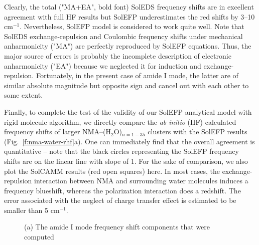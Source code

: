 \documentclass[a4paper,titlepage,twoside,fleqn,12pt]{book}
\begin{document}
\begin{refsection}
Clearly, the total ("MA+EA", bold font) SolEDS frequency shifts 
are in excellent agreement with full HF results
but SolEFP underestimates the red shifts by 3--10 cm$^{-1}$.
Nevertheless, 
SolEFP model is considered to work quite well. Note that 
SolEDS exchange\hyp{}repulsion
and Coulombic frequency shifts under mechanical anharmonicity ("MA")
are perfectly reproduced by SolEFP equations. Thus, the major source of errors
is probably the incomplete description of electronic anharmonicity ("EA")
because we neglected it for induction and exchange\hyp{}repulsion.
Fortunately, in the present case of amide I mode, the latter are
of similar absolute magnitude but opposite sign and cancel out with
each other to some extent.

Finally, to complete the test of the validity of our SolEFP
analytical model with rigid molecule algorithm, we directly
compare the \emph{ab initio} (HF) calculated frequency shifts of
larger NMA--(H$_2$O)$_{n = 1-35}$ clusters with the SolEFP results
(Fig.~\ref{f:nma-water-rhf}a). One can immediately find that the overall
agreement is quantitative -- note that the black circles representing
the SolEFP frequency shifts are on the linear line with
slope of 1. For the sake of comparison, we also plot the SolCAMM 
results (red open squares) here. In most cases, the
exchange\hyp{}repulsion interaction between NMA and surrounding
water molecules induces a frequency blueshift, whereas
the polarization interaction does a redshift. The error associated
with the neglect of charge transfer effect is estimated to
be smaller than 5 cm$^{-1}$.
%
\begin{figure}[t!]
\centering
\setlength\fboxsep{0.4pt}
\setlength\fboxrule{0.5pt}
\caption{
(a) The amide I mode frequency shift components that were computed
}
\end{figure}
\end{refsection}
\end{document}
